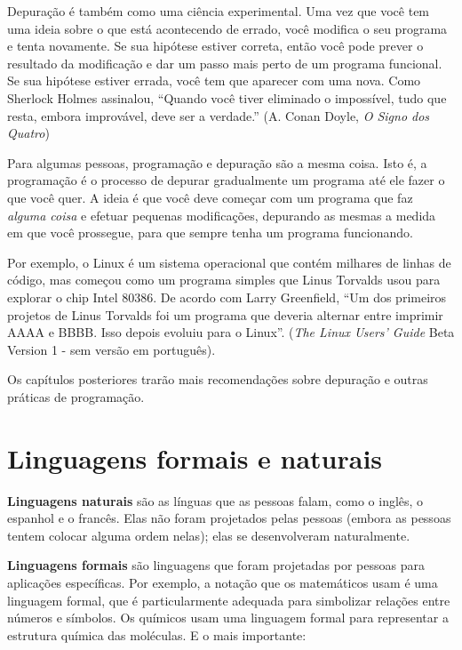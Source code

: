 \documentclass[10pt]{book}
\begin{document}
Depuração é também como uma ciência experimental. Uma vez que você tem uma ideia
sobre o que está acontecendo de errado, você modifica o seu programa e tenta novamente. Se
sua hipótese estiver correta, então você pode prever o resultado da
modificação e dar um passo mais perto de um programa funcional. Se
sua hipótese estiver errada, você tem que aparecer com uma nova. Como
Sherlock Holmes assinalou, ``Quando você tiver eliminado o
impossível, tudo que resta, embora improvável, deve ser a verdade.''
(A. Conan Doyle, {\em O Signo dos Quatro})

Para algumas pessoas, programação e depuração são a mesma coisa. Isto é,
a programação é o processo de depurar gradualmente um programa até
ele fazer o que você quer. A ideia é que você deve começar com um
programa que faz {\em alguma coisa} e efetuar pequenas modificações,
depurando as mesmas a medida em que você prossegue, para que sempre tenha um programa funcionando.

Por exemplo, o Linux é um sistema operacional que contém milhares de
linhas de código, mas começou como um programa simples que Linus Torvalds
usou para explorar o chip Intel 80386. De acordo com Larry Greenfield,
``Um dos primeiros projetos de Linus Torvalds foi um programa que deveria alternar
entre imprimir AAAA e BBBB. Isso depois evoluiu para o Linux''.
({\em  The Linux Users' Guide} Beta Version 1 - sem versão em português).

Os capítulos posteriores trarão mais recomendações sobre depuração e outras
práticas de programação.


\section{Linguagens formais e naturais}

{\bf Linguagens naturais} são as línguas que as pessoas falam,
como o inglês, o espanhol e o francês. Elas não foram projetados
pelas pessoas (embora as pessoas tentem colocar alguma ordem nelas);
elas se desenvolveram naturalmente.

{\bf Linguagens formais} são linguagens que foram projetadas por pessoas para
aplicações específicas. Por exemplo, a notação que os matemáticos
usam é uma linguagem formal, que é particularmente adequada para simbolizar
relações entre números e símbolos. Os químicos usam uma linguagem
formal para representar a estrutura química das moléculas. E
o mais importante:
\end{document}

